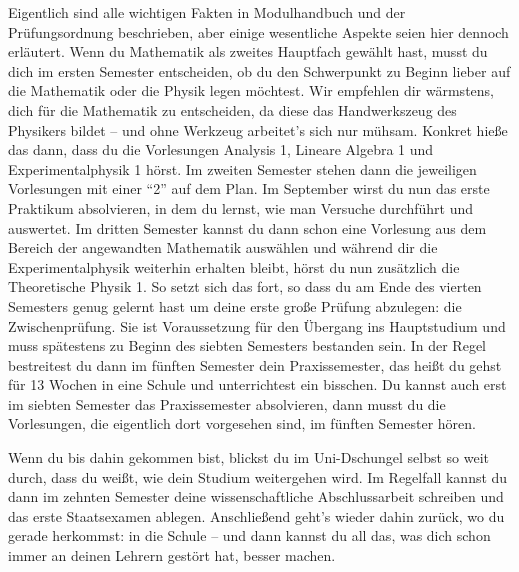 Eigentlich sind alle wichtigen Fakten in Modulhandbuch und der Prüfungsordnung beschrieben, aber einige wesentliche Aspekte seien hier dennoch erläutert. Wenn du Mathematik als zweites Hauptfach gewählt hast, musst du dich im ersten Semester entscheiden, ob du den Schwerpunkt zu Beginn lieber auf die Mathematik oder die Physik legen möchtest. Wir empfehlen dir wärmstens, dich für die Mathematik zu entscheiden, da diese das Handwerkszeug des Physikers bildet -- und ohne Werkzeug arbeitet's sich nur mühsam. Konkret hieße das dann, dass du die Vorlesungen Analysis 1, Lineare Algebra 1 und Experimentalphysik 1 hörst. Im zweiten Semester stehen dann die jeweiligen Vorlesungen mit einer "`2"' auf dem Plan. Im September wirst du nun das erste Praktikum absolvieren, in dem du lernst, wie man Versuche durchführt und auswertet. Im dritten Semester kannst du dann schon eine Vorlesung aus dem Bereich der angewandten Mathematik auswählen und während dir die Experimentalphysik weiterhin erhalten bleibt, hörst du nun zusätzlich die Theoretische Physik 1. So setzt sich das fort, so dass du am Ende des vierten Semesters genug gelernt hast um deine erste große Prüfung abzulegen: die Zwischenprüfung. Sie ist Voraussetzung für den Übergang ins Hauptstudium und muss spätestens zu Beginn des siebten Semesters bestanden sein. In der Regel bestreitest du dann im fünften Semester dein Praxissemester, das heißt du gehst für 13 Wochen in eine Schule und unterrichtest ein bisschen. Du kannst auch erst im siebten Semester das Praxissemester absolvieren, dann musst du die Vorlesungen, die eigentlich dort vorgesehen sind, im fünften Semester hören.

Wenn du bis dahin gekommen bist, blickst du im Uni-Dschungel selbst so weit durch, dass du weißt, wie dein Studium weitergehen wird. Im Regelfall kannst du dann im zehnten Semester deine wissenschaftliche Abschlussarbeit schreiben und das erste Staatsexamen ablegen. Anschließend geht's wieder dahin zurück, wo du gerade herkommst: in die Schule -- und dann kannst du all das, was dich schon immer an deinen Lehrern gestört hat, besser machen.
